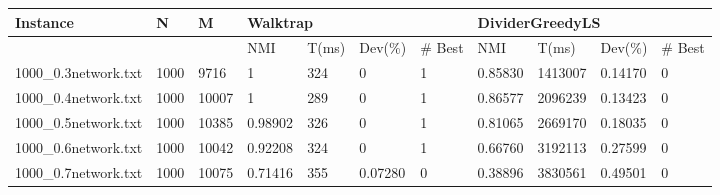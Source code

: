 \begin{sidewaystable}
\begin{tabular}{lllllllllll}
	\end{tabular}
\begin{tabular}{lllllllllll}
	\hline
	\multicolumn{1}{|l|}{Instance}             & \multicolumn{1}{l|}{N}    & \multicolumn{1}{l|}{M}     & \multicolumn{4}{l|}{Walktrap}                                                                                           & \multicolumn{4}{l|}{DividerGreedyLS}                                                                     \\ \hline
	\multicolumn{1}{|l|}{}                     & \multicolumn{1}{l|}{}     & \multicolumn{1}{l|}{}      & \multicolumn{1}{l|}{NMI}     & \multicolumn{1}{l|}{T(ms)} & \multicolumn{1}{l|}{Dev(\%)} & \multicolumn{1}{l|}{\# Best} & \multicolumn{1}{l|}{NMI}     & \multicolumn{1}{l|}{T(ms)}   & \multicolumn{1}{l|}{Dev(\%)} & \multicolumn{1}{l|}{\# Best} \\ \hline
	\multicolumn{1}{|l|}{1000\_0.3network.txt} & \multicolumn{1}{l|}{1000} & \multicolumn{1}{l|}{9716}  & \multicolumn{1}{l|}{1}       & \multicolumn{1}{l|}{324}   & \multicolumn{1}{l|}{0}       & \multicolumn{1}{l|}{1}       & \multicolumn{1}{l|}{0.85830} & \multicolumn{1}{l|}{1413007} & \multicolumn{1}{l|}{0.14170} & \multicolumn{1}{l|}{0}       \\ \hline
	\multicolumn{1}{|l|}{1000\_0.4network.txt} & \multicolumn{1}{l|}{1000} & \multicolumn{1}{l|}{10007} & \multicolumn{1}{l|}{1}       & \multicolumn{1}{l|}{289}   & \multicolumn{1}{l|}{0}       & \multicolumn{1}{l|}{1}       & \multicolumn{1}{l|}{0.86577} & \multicolumn{1}{l|}{2096239} & \multicolumn{1}{l|}{0.13423} & \multicolumn{1}{l|}{0}       \\ \hline
	\multicolumn{1}{|l|}{1000\_0.5network.txt} & \multicolumn{1}{l|}{1000} & \multicolumn{1}{l|}{10385} & \multicolumn{1}{l|}{0.98902} & \multicolumn{1}{l|}{326}   & \multicolumn{1}{l|}{0}       & \multicolumn{1}{l|}{1}       & \multicolumn{1}{l|}{0.81065} & \multicolumn{1}{l|}{2669170} & \multicolumn{1}{l|}{0.18035} & \multicolumn{1}{l|}{0}       \\ \hline
	\multicolumn{1}{|l|}{1000\_0.6network.txt} & \multicolumn{1}{l|}{1000} & \multicolumn{1}{l|}{10042} & \multicolumn{1}{l|}{0.92208} & \multicolumn{1}{l|}{324}   & \multicolumn{1}{l|}{0}       & \multicolumn{1}{l|}{1}       & \multicolumn{1}{l|}{0.66760} & \multicolumn{1}{l|}{3192113} & \multicolumn{1}{l|}{0.27599} & \multicolumn{1}{l|}{0}       \\ \hline
	\multicolumn{1}{|l|}{1000\_0.7network.txt} & \multicolumn{1}{l|}{1000} & \multicolumn{1}{l|}{10075} & \multicolumn{1}{l|}{0.71416} & \multicolumn{1}{l|}{355}   & \multicolumn{1}{l|}{0.07280} & \multicolumn{1}{l|}{0}       & \multicolumn{1}{l|}{0.38896} & \multicolumn{1}{l|}{3830561} & \multicolumn{1}{l|}{0.49501} & \multicolumn{1}{l|}{0}       \\ \hline

\end{tabular}
\end{sidewaystable}
